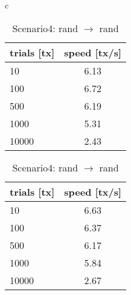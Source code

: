 \documentclass[a4j,11pt,uplatex,onecolumn]{article}
\begin{document}
\begin{table}[htbp]
    \begin{center}
        \begin{tabular}{c}

            \begin{minipage}{0.5\hsize}
                \begin{center}
                    \caption{Scenario3: 0 $\rightleftarrows$ 1, 2 $\rightleftarrows$ 3}
                    \begin{tabular}{|l|c|} \hline
                        trials [tx] & speed [tx/s]\\ \hline \hline
                        10 & 6.13\\
                        100 & 6.72\\
                        500 & 6.19\\
                        1000 & 5.31\\
                        10000 & 2.43\\ \hline
                    \end{tabular}
                \end{center}
            \end{minipage}

            \begin{minipage}{0.5\hsize}
                \begin{center}
                    \caption{Scenario4: rand $\rightarrow$ rand}
                    \begin{tabular}{|l|c|} \hline
                        trials [tx] & speed [tx/s]\\ \hline \hline
                        10 & 6.63\\
                        100 & 6.37\\
                        500 & 6.17\\
                        1000 & 5.84\\
                        10000 & 2.67\\ \hline
                    \end{tabular}
                \end{center}
            \end{minipage}

        \end{tabular}
    \end{center}
\end{table}
\end{document}
